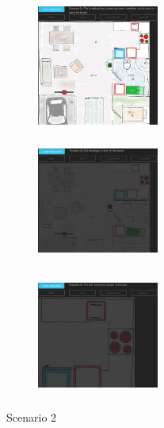 \begin{figure}[ht]
\centering
\begin{subfigure}{0.23\textwidth}
\includegraphics[width=4cm, height=4cm]{fig/scenario2a}
\caption{}
\label{fig:2a}
\end{subfigure}
\begin{subfigure}{0.23\textwidth}
\includegraphics[width=4cm, height=4cm]{fig/scenario2b}
\caption{}
\label{fig:2b}
\end{subfigure}
\begin{subfigure}{0.23\textwidth}
\includegraphics[width=4cm, height=4cm]{fig/scenario2c}
\caption{}
\label{fig:2c}
\end{subfigure}
\caption{Scenario 2}
\label{fig:scenario2}
\end{figure}
